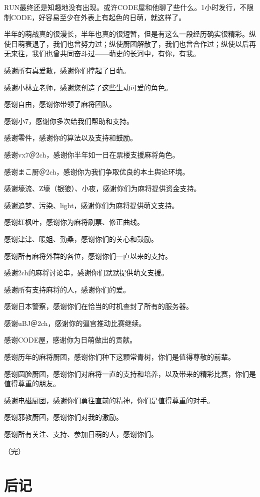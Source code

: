 RUN最终还是知趣地没有出现。或许CODE屋和他聊了些什么。1小时发行，不限制CODE，好容易至少在外表上有起色的日萌，就这样了。

半年的萌战真的很漫长，半年也真的很短暂，但是有这么一段经历确实很精彩。纵使日萌衰退了，我们也曾努力过；纵使厨团解散了，我们也曾合作过；纵使以后再无来往，我们也曾共同奋斗过——萌史的长河中，有你，有我。

感谢所有真爱散，感谢你们撑起了日萌。

感谢小林立老师，感谢您创造了这些生动可爱的角色。

感谢自由，感谢你带领了麻将团队。

感谢小7，感谢你多次给我们帮助和支持。

感谢零件，感谢你的算法以及支持和鼓励。

感谢vx7＠2ch，感谢你半年如一日在票楼支援麻将角色。

感谢まこ厨＠2ch，感谢你为我们争取优良的本土舆论环境。

感谢壕流、Z壕（银狼）、小夜，感谢你们为麻将提供资金支持。

感谢追梦、污染、light，感谢你们为麻将提供萌文支持。

感谢红枫叶，感谢你为麻将刷票、修正曲线。

感谢津津、暖姐、勤桑，感谢你们的关心和鼓励。

感谢所有麻将外群的各位，感谢你们一直以来的支持。

感谢2ch的麻将讨论串，感谢你们默默提供萌文支援。

感谢所有支持麻将的人，感谢你们的爱。

感谢日本警察，感谢你们在恰当的时机查封了所有的服务器。

感谢uBJ＠2ch，感谢你的逼宫推动比赛继续。

感谢CODE屋，感谢你为日萌做出的贡献。

感谢历年的麻将厨团，感谢你们种下这颗常青树，你们是值得尊敬的前辈。

感谢圆脸厨团，感谢你们对麻将一直的支持和培养，以及带来的精彩比赛，你们是值得尊重的朋友。

感谢电磁厨团，感谢你们勇往直前的精神，你们是值得尊重的对手。

感谢邪教厨团，感谢你们对我的激励。

感谢所有关注、支持、参加日萌的人，感谢你们。

（完）

\chapter*{后记}

